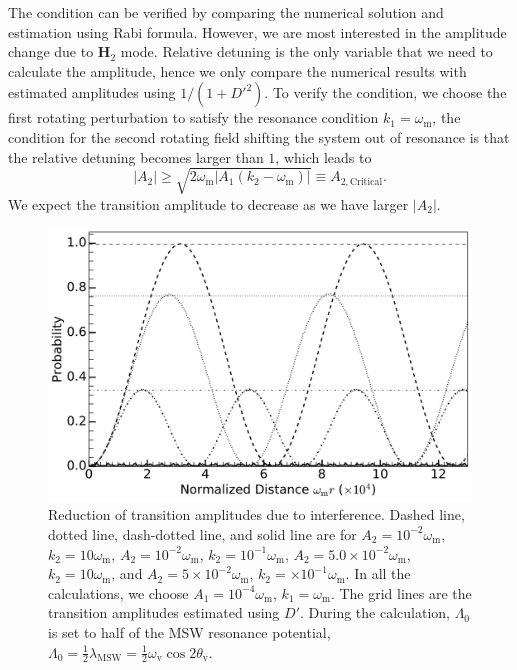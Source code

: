 \documentclass[%
reprint,
 amsmath,amssymb,
 prd,
]{revtex4-1}
\newcommand{\RD}{D}
\begin{document}
The condition can be verified by comparing the numerical solution and estimation using Rabi formula. However, we are most interested in the amplitude change due to $\mathbf H_2$ mode. Relative detuning is the only variable that we need to calculate the amplitude, hence we only compare the numerical results with estimated amplitudes using $1/(1+\RD'^2)$.
To verify the condition, we choose the first rotating perturbation to satisfy the resonance condition $k_1=\omega_{\mathrm{m}}$, the condition for the second rotating field shifting the system out of resonance is that the relative detuning becomes larger than $1$, which leads to
\begin{equation}
\lvert A_2 \rvert \geq \sqrt{2\omega_{\mathrm{m}} \lvert A_1 (k_2-\omega_{\mathrm m})\rvert} \equiv A_{2,\mathrm{Critical}}.
\end{equation}
We expect the transition amplitude to decrease as we have larger $\lvert A_2\rvert$.


\begin{figure}
                \centering
                \includegraphics[width=\columnwidth]{assets/interference-reduction}
                \caption{Reduction of transition amplitudes due to interference. Dashed line, dotted line, dash-dotted line, and solid line are for $A_2=10^{-2}\omega_{\mathrm{m}}$, $k_2=10\omega_{\mathrm m}$, $A_2=10^{-2}\omega_{\mathrm{m}}$, $k_2=10^{-1}\omega_{\mathrm m}$, $A_2=5.0\times 10^{-2}\omega_{\mathrm{m}}$, $k_2=10\omega_{\mathrm m}$, and $A_2=5\times 10^{-2}\omega_{\mathrm{m}}$, $k_2=\times 10^{-1}\omega_{\mathrm m}$. In all the calculations, we choose $A_1=10^{-4}\omega_{\mathrm m}$, $k_1=\omega_{\mathrm m}$. The grid lines are the transition amplitudes estimated using $\RD'$. During the calculation, $\Lambda_0$ is set to half of the MSW resonance potential, $\Lambda_0 = \frac{1}{2}\lambda_{\mathrm{MSW}}=\frac{1}{2}\omega_{\mathrm{v}}\cos 2\theta_{\mathrm v}$.}
                \label{fig-rabi-oscillations-energy-gap-change}
\end{figure}
\end{document}
